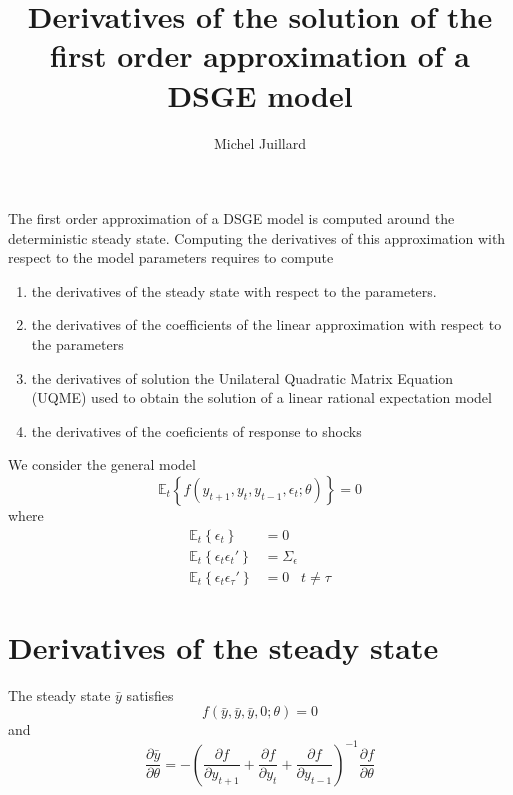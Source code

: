 \documentclass{article}
\title{Derivatives of the solution of the first order approximation of
a DSGE model}
\author{Michel Juillard}
\begin{document}
\maketitle

The first order approximation of a DSGE model is computed around the
deterministic steady state. Computing the derivatives of this
approximation with respect to the model parameters requires to compute
\begin{enumerate}
  \item the derivatives of the steady state with respect to
    the parameters.
  \item the derivatives of the coefficients of the linear
    approximation with respect to the parameters
  \item the derivatives of solution the Unilateral Quadratic
    Matrix Equation (UQME) used to obtain the solution of a linear
    rational expectation model
  \item the derivatives of the coeficients of response to shocks
\end{enumerate}

We consider the general model
\[
\mathbb{E}_t \left\{ f(y_{t+1}, y_t, y_{t-1}, \epsilon_t;
\theta)\right\} = 0
\]
where
\begin{align*}
  \mathbb{E}_t\left\{\epsilon_t\right\} &= 0\\
  \mathbb{E}_t\left\{\epsilon_t\epsilon_t'\right\} &= \Sigma_\epsilon\\
  \mathbb{E}_t\left\{\epsilon_t\epsilon_\tau'\right\} &= 0\;\;\;
  t\ne\tau
\end{align*}
      
\section{Derivatives of the steady state}

The steady state $\bar y$ satisfies
\[
f(\bar y, \bar y, \bar y, 0;\theta) = 0
\]
and
\[
\frac{\partial \bar y}{\partial \theta} = -\left(\frac{\partial
  f}{\partial y_{t+1}} +\frac{\partial f}{\partial y_t} + \frac{\partial
      f}{\partial y_{t-1}}\right)^{-1}\frac{\partial f}{\partial \theta}
\]
\end{document}
